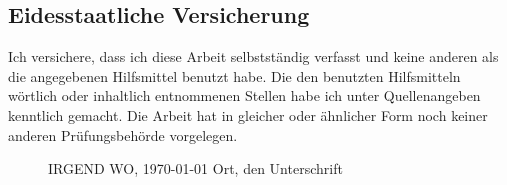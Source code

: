 \documentclass[12pt, oneside]{article}  		%
\begin{document}
\begin{spacing}{1.5}
\section{Eidesstaatliche Versicherung}
Ich versichere, dass ich diese Arbeit selbstständig verfasst und keine anderen als
die angegebenen Hilfsmittel benutzt habe. Die den benutzten Hilfsmitteln wörtlich
oder inhaltlich entnommenen Stellen habe ich unter Quellenangeben kenntlich
gemacht. Die Arbeit hat in gleicher oder ähnlicher Form noch keiner anderen
Prüfungsbehörde vorgelegen.
\par \vspace{1cm}
\begin{figure}[H]
	IRGEND WO, \today
	\hspace{3.6cm}
	Ort, den Unterschrift
\end{figure}

\end{spacing}
\end{document}
